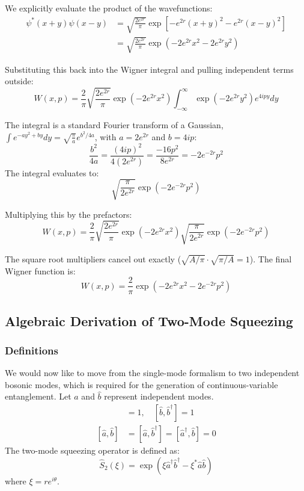 We explicitly evaluate the product of the wavefunctions:
\begin{align*}
\psi^*(x+y)\psi(x-y) &= \sqrt{\frac{2e^{2r}}{\pi}} \exp\left[ -e^{2r}(x+y)^2 - e^{2r}(x-y)^2 \right] \\
&= \sqrt{\frac{2e^{2r}}{\pi}} \exp\left( -2e^{2r}x^2 - 2e^{2r}y^2 \right)
\end{align*}

Substituting this back into the Wigner integral and pulling independent terms outside:
\begin{equation*}
W(x,p) = \frac{2}{\pi} \sqrt{\frac{2e^{2r}}{\pi}} \exp\left(-2e^{2r}x^2\right) \int_{-\infty}^{\infty} \exp\left(-2e^{2r}y^2\right) e^{4ipy} dy
\end{equation*}

The integral is a standard Fourier transform of a Gaussian, $\int e^{-ay^2 + by} dy = \sqrt{\frac{\pi}{a}} e^{b^2 / 4a}$, with $a = 2e^{2r}$ and $b = 4ip$:
\begin{equation*}
\frac{b^2}{4a} = \frac{(4ip)^2}{4(2e^{2r})} = \frac{-16p^2}{8e^{2r}} = -2e^{-2r}p^2
\end{equation*}
The integral evaluates to:
\begin{equation*}
\sqrt{\frac{\pi}{2e^{2r}}} \exp\left(-2e^{-2r}p^2\right)
\end{equation*}

Multiplying this by the prefactors:
\begin{equation*}
W(x,p) = \frac{2}{\pi} \sqrt{\frac{2e^{2r}}{\pi}} \exp\left(-2e^{2r}x^2\right) \sqrt{\frac{\pi}{2e^{2r}}} \exp\left(-2e^{-2r}p^2\right)
\end{equation*}

The square root multipliers cancel out exactly ($\sqrt{A/\pi} \cdot \sqrt{\pi/A} = 1$). The final Wigner function is:
\begin{equation}
W(x,p) = \frac{2}{\pi} \exp\left(-2e^{2r}x^2 - 2e^{-2r}p^2\right)
\end{equation}

\newpage

\subsection{Algebraic Derivation of Two-Mode Squeezing}

\subsubsection{Definitions}
We would now like to move from the single-mode formalism to two independent bosonic modes, which is required for the generation of continuous-variable entanglement.
Let $\hat{a}$ and $\hat{b}$ represent independent modes.
\begin{align*}
[\hat{a}, \hat{a}^\dagger] &= 1, \quad [\hat{b}, \hat{b}^\dagger] = 1 \\
[\hat{a}, \hat{b}] &= [\hat{a}, \hat{b}^\dagger] = [\hat{a}^\dagger, \hat{b}] = 0
\end{align*}
The two-mode squeezing operator is defined as:
\begin{equation*}
\hat{S}_2(\xi) = \exp(\xi\hat{a}^\dagger\hat{b}^\dagger - \xi^*\hat{a}\hat{b})
\end{equation*}
where $\xi = re^{i\theta}$.

